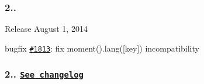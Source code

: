 \subsubsection*{2..}


\begin{DoxyItemize}
\item Release August 1, 2014
\item bugfix \href{https://github.com/moment/moment/issues/1813}{\tt \#1813}\+: fix moment().lang(\mbox{[}key\mbox{]}) incompatibility
\end{DoxyItemize}

\subsubsection*{2.. \href{https://gist.github.com/ichernev/ac3899324a5fa6c8c9b4}{\tt See changelog}}


